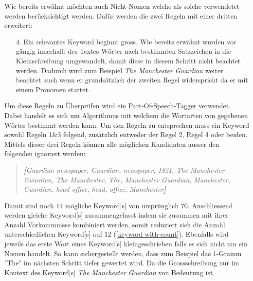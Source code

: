 Wie bereits erwähnt möchten auch Nicht-Nomen welche als solche verwendetet werden berücksichtigt werden. Dafür werden die zwei Regeln mit einer dritten erweitert:

\begin{enumerate}
    \item[4.] Ein relevantes \gls{Keyword} beginnt gross. Wie bereits erwähnt wurden vor gängig innerhalb des Textes Wörter nach bestimmten Satzzeichen in die Kleinschreibung umgewandelt, damit diese in diesem Schritt nicht beachtet werden. Dadurch wird zum Beispiel \textit{The Manchester Guardian} weiter beachtet auch wenn er grundsätzlich der zweiten Regel widerspricht da er mit einem Pronomen startet. 
\end{enumerate}

Um diese Regeln zu Überprüfen wird ein \hyperref[part-of-speech]{Part-Of-Speech-Tagger} verwendet. Dabei handelt es sich um Algorithmus mit welchem die Wortarten von gegebenen Wörter bestimmt werden kann. Um den Regeln zu entsprechen muss ein \gls{Keyword} sowohl Regeln 1\&3 folgend, zusätzlich entweder der Regel 2, Regel 4 oder beiden. Mittels dieser drei Regeln können alle möglichen Kandidaten ausser den folgenden ignoriert werden:

\begin{quote}
\textit{\textbf{[}Guardian newspaper, Guardian, newspaper, 1821, The Manchester Guardian, The Manchester, The, Manchester Guardian, Manchester, Guardian, head office, head, office, Manchester\textbf{]}}
\end{quote}

Damit sind noch $14$ mögliche \gls{Keyword}[s] von ursprünglich $70$. Anschliessend werden gleiche \gls{Keyword}[s] zusammengefasst indem sie zusammen mit ihrer Anzahl Vorkommnisse kombiniert werden, somit reduziert sich die Anzahl unterschiedlichen \gls{Keyword}[s] auf $12$ (\autoref{keyword-with-count}). Ebenfalls wird jeweils das erste Wort eines \gls{Keyword}[s] kleingeschrieben falls es sich nicht um ein Nomen handelt. So kann sichergestellt werden, dass zum Beispiel das 1-Gramm "The" im nächsten Schritt tiefer gewertet wird. Da die Grossschreibung nur im Kontext des \gls{Keyword}[s] \textit{The Manchester Guardian} von Bedeutung ist.

